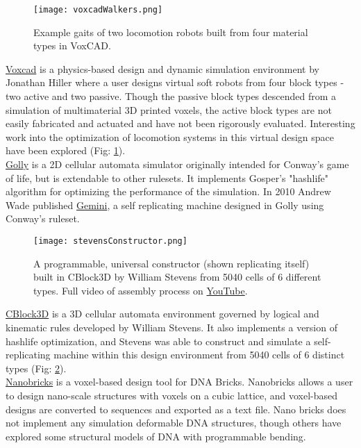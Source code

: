 {\begin{figure}
  \texttt{[image: voxcadWalkers.png]}
  \caption{Example gaits of two locomotion robots built from four material types in VoxCAD\cite{Cheney2013b}.}
  \label{fig:voxcadWalkers}
\end{figure}
\href{http://www.voxcad.com/}{Voxcad} is a physics-based design and dynamic simulation environment by Jonathan Hiller where a user designs virtual soft robots from four block types - two active and two passive\cite{Hiller2014a}.  Though the passive block types descended from a simulation of multimaterial 3D printed voxels, the active block types are not easily fabricated and actuated\cite{Hiller2012} and have not been rigorously evaluated.  Interesting work into the optimization of locomotion systems in this virtual design space have been explored (Fig: \ref{fig:voxcadWalkers})\cite{Cheney2013b}\cite{Cheney2013}\cite{Cheney2015}.
\\

\href{http://golly.sourceforge.net/}{Golly} is a 2D cellular automata simulator originally intended for Conway's game of life, but is extendable to other rulesets.  It implements Gosper's "hashlife" algorithm for optimizing the performance of the simulation\cite{Gosper1984}.  In 2010 Andrew Wade published \href{https://www.youtube.com/watch?v=A8B5MbHPlH0}{Gemini}, a self replicating machine designed in Golly using Conway's ruleset.
\\

\begin{figure}
  \texttt{[image: stevensConstructor.png]}
  \caption{A programmable, universal constructor (shown replicating itself) built in CBlock3D by William Stevens from 5040 cells of 6 different types\cite{Stevens2009b}.  Full video of assembly process on  \href{https://www.youtube.com/watch?v=PBXO_6Jn1fs}{YouTube}.}
  \label{fig:stevensConstructor}
\end{figure}
\href{https://www.youtube.com/watch?feature=player_embedded&v=PBXO_6Jn1fs}{CBlock3D} is a 3D cellular automata environment governed by logical and kinematic rules developed by William Stevens\cite{Stevens2007}\cite{Stevens2009}.  It also implements a version of hashlife optimization\cite{Stevens2010}, and Stevens was able to construct and simulate a self-replicating machine within this design environment from 5040 cells of 6 distinct types (Fig: \ref{fig:stevensConstructor})\cite{Stevens2009b}.
\\

\href{http://yin.hms.harvard.edu/bricks/try/}{Nanobricks} is a voxel-based design tool for DNA Bricks.  Nanobricks allows a user to design nano-scale structures with voxels on a cubic lattice, and voxel-based designs are converted to sequences and exported as a text file.  Nano bricks does not implement any simulation deformable DNA structures, though others have explored some structural models of DNA with programmable bending\cite{Dietz2009}\cite{Kim2012}.
\\

}

